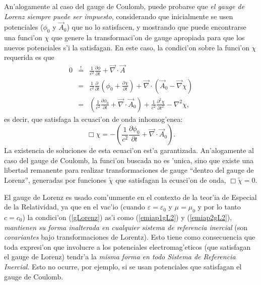 An'alogamente al caso del gauge de Coulomb, puede probarse que \textit{el gauge de Lorenz siempre puede ser impuesto}, considerando que inicialmente se usen potenciales ($\phi_0$ y $\vec{A}_0$) que no lo satisfacen, y mostrando que puede encontrarse una funci'on $\chi$ que genere la transformaci'on de gauge apropiada para que los nuevos potenciales s'i la satisfagan. En este caso, la condici'on sobre la funci'on $\chi$ requerida es que
\begin{eqnarray}
0&\stackrel{!}{=}&\frac{1}{c^2}\frac{\partial\phi}{\partial t}+\vec{\nabla}\cdot\vec{A} \\
&=&\frac{1}{c^2}\frac{\partial\ }{\partial t}\left(\phi_0+\frac{\partial\chi}{\partial t}\right)+\vec{\nabla}\cdot\left(\vec{A}_0-\vec\nabla\chi\right) \\
&=&\left(\frac{1}{c^2}\frac{\partial\phi_0}{\partial t} +\vec{\nabla}\cdot\vec{A}_0\right) +\frac{1}{c^2}\frac{\partial^2\chi }{\partial t^2}-\nabla^2\chi,
\end{eqnarray}
es decir, que satisfaga la ecuaci'on de onda inhomog'enea:
\begin{equation}
\Box\chi=-\left(\frac{1}{c^2}\frac{\partial\phi_0}{\partial t} +\vec{\nabla}\cdot\vec{A}_0\right).
\end{equation}
La existencia de soluciones de esta ecuaci'on est'a garantizada. An'alogamente al caso del gauge de Coulomb, la funci'on buscada no es 'unica, sino que existe una libertad remanente para realizar transformaciones de gauge ``dentro del gauge de Lorenz'', generadas por funciones $\tilde\chi$ que satisfagan la ecuaci'on de onda, $\Box\tilde\chi=0$. 

El gauge de Lorenz es usado com'unmente en el contexto de la teor'ia de Especial de la Relatividad, ya que en el vac'io (cuando $\varepsilon=\varepsilon_0$ y $\mu=\mu_0$ y por lo tanto $c=c_0$) la condici'on (\ref{gLorenz}) as'i como (\ref{emiap1gL2}) y (\ref{emiap2gL2}), \textit{mantienen su forma inalterada en cualquier sistema de referencia inercial} (son \textit{covariantes} bajo transformaciones de Lorentz). Esto tiene como consecuencia que toda expresi'on que involucre a los potenciales electromag'eticos (que satisfagan el gauge de Lorenz) tendr'a la \textit{misma forma en todo Sistema de Referencia Inercial}. Esto no ocurre, por ejemplo, si se usan potenciales que satisfagan el gauge de Coulomb.